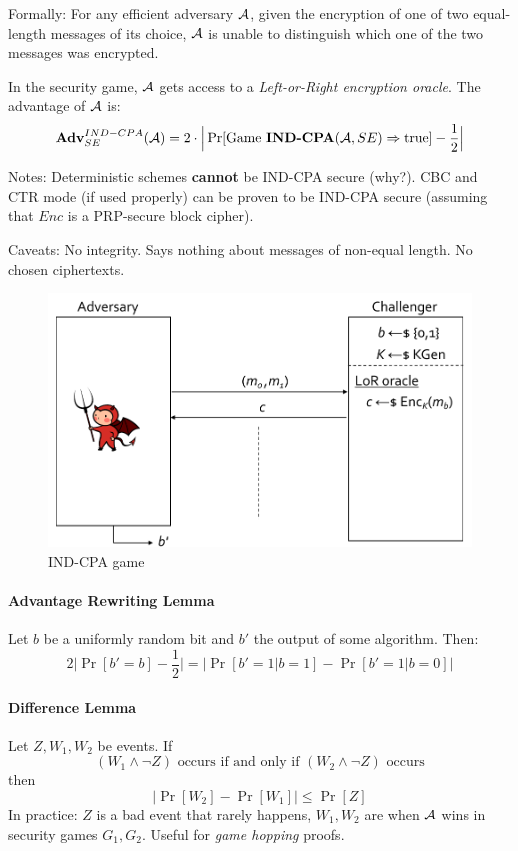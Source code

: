 Formally:
For any efficient adversary $\mathcal{A}$, given the encryption of one of two equal-length messages of its choice,
$\mathcal{A}$ is unable to distinguish which one of the two messages was encrypted.

In the security game, $\mathcal{A}$ gets access to a \emph{Left-or-Right encryption oracle}.
The advantage of $\mathcal{A}$ is:
$$
\mathbf{Adv}^{IND-CPA}_{SE} (\mathcal{A})
= 2 \cdot \Big| \Pr[ \text{Game }\textbf{IND-CPA}(\mathcal{A}, SE) \Rightarrow \text{true} ] - \frac{1}{2} \Big|
$$

Notes:
Deterministic schemes \textbf{cannot} be IND-CPA secure (why?).
CBC and CTR mode (if used properly) can be proven to be IND-CPA secure (assuming that $Enc$ is a PRP-secure block cipher).

Caveats:
No integrity. Says nothing about messages of non-equal length. No chosen ciphertexts.

\begin{figure}[h]
    \centering
	\includegraphics[scale=0.4]{images/ind-cpa.png}
    \caption{IND-CPA game}
    \label{fig:ind-cpa}
\end{figure}

\paragraph{Advantage Rewriting Lemma}
Let $b$ be a uniformly random bit and $b'$ the output of some algorithm. Then:
$$
2 \Big| \Pr[b'=b] - \frac{1}{2} \Big| = \Big| \Pr[b'=1|b=1] - \Pr[b'=1|b=0] \Big|
$$

\paragraph{Difference Lemma}
Let $Z, W_1, W_2$ be events. If
$$
(W_1 \wedge \neg Z) \text{ occurs if and only if } (W_2 \wedge \neg Z) \text{ occurs}
$$
then
$$
\Big| \Pr[W_2] - \Pr[W_1] \Big| \leq \Pr[Z]
$$
In practice: $Z$ is a bad event that rarely happens, $W_1, W_2$ are when $\mathcal{A}$ wins in security games $G_1, G_2$.
Useful for \emph{game hopping} proofs.

